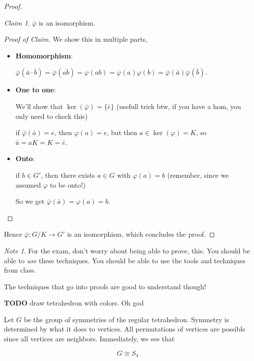 \documentclass[12pt]{article}
\def\TODO{\color{red}\textbf{TODO}\color{black}}
\theoremstyle{remark}
\theoremstyle{remark}
\newtheorem{claim}{Claim}
\theoremstyle{remark}
\theoremstyle{remark}
\theoremstyle{remark}
\newtheorem*{note}{Note}
\begin{document}
\begin{proof}
  \begin{claim}
    $\bar \varphi$ is an isomorphism.
  \end{claim}

  \begin{proof}[Proof of Claim]
    We show this in multiple parts,
    \begin{itemize}
      \item {\bf Homomorphism}:

        $\bar \varphi(\bar a \cdot \bar b) = \bar \varphi(\overline{ab}) =
        \varphi(ab) = \varphi(a) \varphi(b) = \bar \varphi(\bar a) \bar
        \varphi(\bar b)$.

      \item {\bf One to one}:

        We'll show that $\ker(\bar \varphi) = \{ \bar e \}$ (usefull trick btw, if you have a hom, you only need to check this)

        if $\bar \varphi(\bar a) = e$, then $\varphi(a) = e$, but then $a \in
        \ker(\varphi) = K$, so $\bar a = aK = K = \bar e$.

      \item {\bf Onto}:

        if $b \in G'$, then there exists $a \in G$ with $\varphi(a) = b$
        (remember, since we assumed $\varphi$ to be onto!)

        So we get $\bar \varphi(\bar a) = \varphi(a) = b$.
    \end{itemize}
  \end{proof}

  Hence $\bar \varphi: G / K \to G'$ is an isomorphism, which concludes the
  proof.
\end{proof}

\begin{note}
  For the exam, don't worry about being able to prove, this. You should be able
  to {\it use} these techniques. You should be able to use the tools and
  techniques from class.

  The techniques that go into proofs are good to understand though!
\end{note}

\TODO{} draw tetrahedron with colors. Oh god

Let $G$ be the group of symmetries of the regular tetrahedron. Symmetry is
determined by what it does to vertices. All permutations of vertices are
possible since all vertices are neighbors. Immediately, we see that

\[
  G \cong S_4
\]
\end{document}
